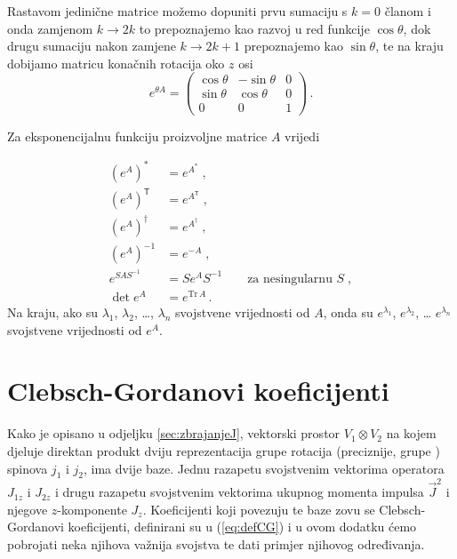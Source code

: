 Rastavom jedinične matrice možemo dopuniti prvu sumaciju s $k=0$ članom
i onda zamjenom $k\to 2k$ to prepoznajemo kao razvoj u red funkcije $\cos\theta$,
dok drugu sumaciju nakon zamjene $k \to  2k+1$ prepoznajemo kao $\sin\theta$,
te na kraju dobijamo matricu konačnih rotacija oko $z$ osi
\begin{equation}
    e^{\theta A} =  
            \begin{pmatrix}
                \cos\theta & -\sin\theta & 0 \\
                \sin\theta & \cos\theta & 0 \\
                0 & 0 & 1
            \end{pmatrix} \,.
\end{equation}

Za eksponencijalnu funkciju proizvoljne matrice $A$ vrijedi

\begin{align}
    \left(e^A\right)^* &= e^{A^*} \;,  \\
    \left(e^A\right)^\mathsf{T} &= e^{A^\mathsf{T}} \;,  \\
    \left(e^A\right)^\dagger &= e^{A^\dagger} \;,  \\
    \left(e^A\right)^{-1} &= e^{-A} \;,  \\
    e^{SAS^{-1}} &= Se^{A}S^{-1} \qquad \text{za nesingularnu $S$} \;,  \\
    \det e^{A} &= e^{\mathrm{Tr}\,A} \,.
\end{align}
Na kraju, ako su $\lambda_1$, $\lambda_{2}$, \ldots, $\lambda_n$ svojstvene
vrijednosti od $A$, onda su $e^{\lambda_{1}}$, $e^{\lambda_2}$, \ldots
    $e^{\lambda_n}$ svojstvene vrijednosti od $e^A$.

\chapter{Clebsch-Gordanovi koeficijenti}
\label{sec:clebsch}

Kako je opisano u odjeljku \ref{sec:zbrajanjeJ}, vektorski prostor
$V_1 \otimes V_2$ na kojem djeluje direktan produkt dviju reprezentacija
grupe rotacija (preciznije, grupe ) spinova $j_1$ i $j_2$, ima
dvije baze. Jednu razapetu svojstvenim vektorima operatora $J_{1z}$
i $J_{2z}$ i drugu razapetu svojstvenim vektorima ukupnog momenta
impulsa  $\vec{J}^2$ i njegove $z$-komponente $J_z$.
Koeficijenti koji povezuju te baze zovu se Clebsch-Gordanovi koeficijenti,
definirani su u (\ref{eq:defCG}) i u ovom dodatku ćemo pobrojati neka
njihova važnija svojstva te dati primjer njihovog određivanja.


